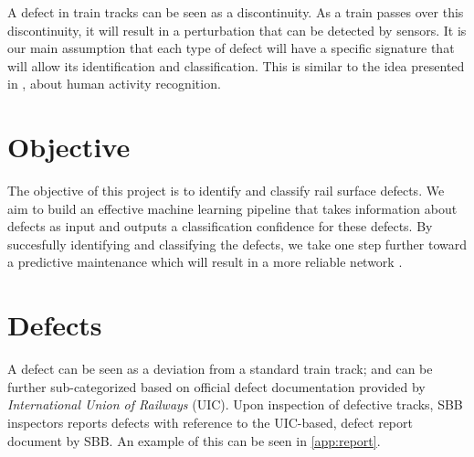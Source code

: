 A defect in train tracks can be seen as a discontinuity. As a train passes over this discontinuity, it will result in a perturbation that can be detected by sensors. It is our main assumption that each type of defect will have a specific signature that will allow its identification and classification. This is similar to the idea presented in \cite{Introduc31:online}, \cite{pmid28590422} about human activity recognition.

\section{Objective}
The objective of this project is to identify and classify rail surface defects. We aim to build an effective machine learning pipeline that takes information about defects as input and outputs a classification confidence for these defects. By succesfully identifying and classifying the defects, we take one step further toward a predictive maintenance which will result in a more reliable network \cite{unknown}.

\section{Defects}
A defect can be seen as a deviation from a standard train track; and can be further sub-categorized based on official defect documentation \cite{rail:online} provided by \textit{International Union of Railways} (UIC). Upon inspection of defective tracks, SBB inspectors reports defects with reference to the UIC-based, defect report document by SBB. An example of this can be seen in \ref{app:report}.

